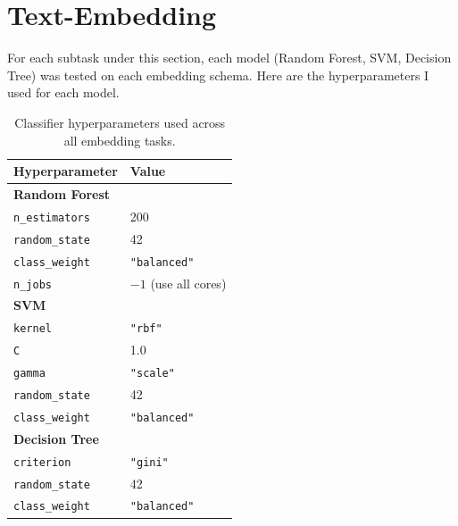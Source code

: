 \documentclass[12pt]{article}
\begin{document}
\section*{Text-Embedding}

For each subtask under this section, each model (Random Forest, SVM, Decision Tree) was tested
on each embedding schema. Here are the hyperparameters I used for each model.

\begin{table}[H]
    \centering
    \renewcommand{\arraystretch}{1.4}
    \begin{tabular}{p{5.0cm} p{8.0cm}}
        \toprule
        \rowcolor{tableheader}
        \color{white}\textbf{Hyperparameter} & \color{white}\textbf{Value} \\
        \midrule
        \multicolumn{2}{l}{\cellcolor{rowalt!60}\textbf{Random Forest}} \\
        \rowcolor{rowalt} \texttt{n\_estimators}  & 200 \\
                          \texttt{random\_state}  & 42 \\
        \rowcolor{rowalt} \texttt{class\_weight}  & \texttt{"balanced"} \\
                          \texttt{n\_jobs}        & $-1$ (use all cores) \\
        \midrule
        \multicolumn{2}{l}{\cellcolor{rowalt!60}\textbf{SVM}} \\
        \rowcolor{rowalt} \texttt{kernel}         & \texttt{"rbf"} \\
                          \texttt{C}              & 1.0 \\
        \rowcolor{rowalt} \texttt{gamma}          & \texttt{"scale"} \\
                          \texttt{random\_state}  & 42 \\
        \rowcolor{rowalt} \texttt{class\_weight}  & \texttt{"balanced"} \\
        \midrule
        \multicolumn{2}{l}{\cellcolor{rowalt!60}\textbf{Decision Tree}} \\
        \rowcolor{rowalt} \texttt{criterion}      & \texttt{"gini"} \\
                          \texttt{random\_state}  & 42 \\
        \rowcolor{rowalt} \texttt{class\_weight}  & \texttt{"balanced"} \\
        \bottomrule
    \end{tabular}
    \caption{Classifier hyperparameters used across all embedding tasks.}
    \label{tab:hyperparameters}
\end{table}
\end{document}
